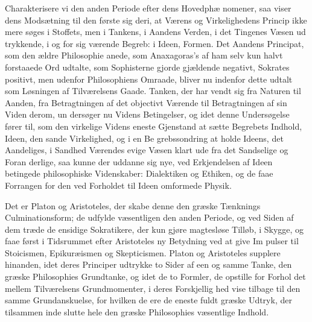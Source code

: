 \documentclass[12pt,a4paper]{book}
\begin{document}
Charakterisere vi den anden Periode efter dens Hovedphæ\-%
nomener, saa viser dens Modsætning til den første sig deri, at
Værens og Virkelighedens Princip ikke mere søges i Stoffets,
men i Tankens, i Aandens Verden, i det Tingenes Væsen ud\-%
trykkende, i og for sig værende Begreb: i Ideen, Formen.
Det Aandens Principat, som den ældre Philosophie anede, som
Anaxagoras's af ham selv kun halvt forstaaede Ord udtalte,
som Sophisterne gjorde gjældende negativt, Sokrates positivt,
men udenfor Philosophiens Omraade, bliver nu indenfor dette
udtalt som Løsningen af Tilværelsens Gaade. Tanken, der har
vendt sig fra Naturen til Aanden, fra Betragtningen af det
objectivt Værende til Betragtningen af sin Viden derom, un\-%
dersøger nu Videns Betingelser, og idet denne Undersøgelse
fører til, som den virkelige Videns eneste Gjenstand at sætte
Begrebets Indhold, Ideen, den sande Virkelighed, og i en Be\-%
grebssondring at holde Ideens, det Aandeliges, i Sandhed
Værendes evige Væsen klart ude fra det Sandselige og Foran\-%
derlige, saa kunne der uddanne sig nye, ved Erkjendelsen af
Ideen betingede philosophiske Videnskaber: Dialektiken og
Ethiken, og de faae Forrangen for den ved Forholdet til Ideen
omformede Physik.

Det er Platon og Aristoteles, der skabe denne den græske
Tænknings Culminationsform; de udfylde væsentligen den anden
Periode, og ved Siden af dem træde de ensidige Sokratikere,
der kun gjøre magtesløse Tilløb, i Skygge, og faae først i
Tidsrummet efter Aristoteles ny Betydning ved at give Im\-%
pulser til Stoicismen, Epikuræismen og Skepticismen. Platon
og Aristoteles supplere hinanden, idet deres Principer udtrykke
to Sider af een og samme Tanke, den græske Philosophies
Grundtanke, og idet de to Formler, de opstille for Forhol\-%
det mellem Tilværelsens Grundmomenter, i deres Forskjellig\-%
hed vise tilbage til den samme Grundanskuelse, for hvilken
de ere de eneste fuldt græske Udtryk, der tilsammen inde\-%
slutte hele den græske Philosophies væsentlige Indhold.
\end{document}
